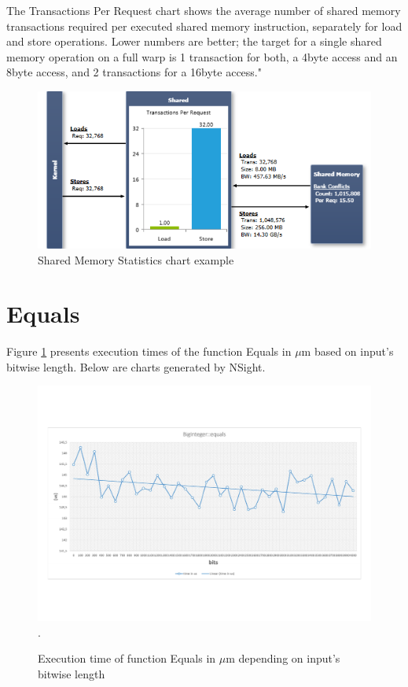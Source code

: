 \documentclass[oneside,openright,12pt,final,en]{mgr}
\begin{document}
\begin{itemize}
	The Transactions Per Request chart shows the average number of shared memory transactions required per executed shared memory instruction, separately for load and store operations. Lower numbers are better; the target for a single shared memory operation on a full warp is 1 transaction for both, a 4byte access and an 8byte access, and 2 transactions for a 16byte access."
	
	\begin{figure}[H]
		\centering
		\includegraphics{MemoryStatisticsSharedChart}
		\caption{Shared Memory Statistics chart example}
	\end{figure}

\end{itemize}


\section{Equals}
Figure \ref{fig:equals} presents execution times of the function Equals in $\mu$m based on input's bitwise length. Below are charts generated by NSight.
\begin{figure}[H]
	\centering
	\includegraphics[width=\textwidth,trim={0 2.5cm 0 2.5cm},clip]{equals.pdf}.
	\caption{Execution time of function Equals in $\mu$m depending on input's bitwise length}
	\label{fig:equals}
\end{figure}
\end{document}
